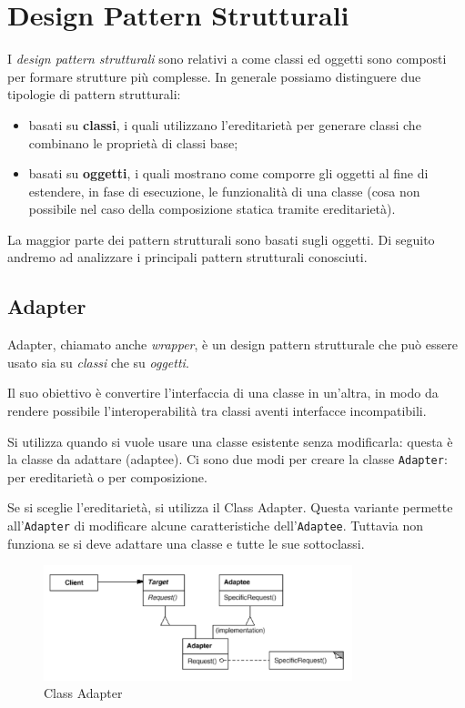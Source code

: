 \section{Design Pattern Strutturali}
I \textit{design pattern strutturali} sono relativi a come classi ed oggetti sono composti per formare strutture più complesse. 
In generale possiamo distinguere due tipologie di pattern strutturali:
\begin{itemize}
\item basati su \textbf{classi}, i quali utilizzano l'ereditarietà per generare classi che combinano le proprietà di classi base;
\item basati su \textbf{oggetti}, i quali mostrano come comporre gli oggetti al fine di estendere, in fase di esecuzione, le funzionalità di una classe (cosa non possibile nel caso della composizione statica tramite ereditarietà).
\end{itemize}
La maggior parte dei pattern strutturali sono basati sugli oggetti.
Di seguito andremo ad analizzare i principali pattern strutturali conosciuti.

\subsection{Adapter}
Adapter, chiamato anche \textit{wrapper}, è un design pattern strutturale che può essere usato sia su \textit{classi} che su \textit{oggetti}.

Il suo obiettivo è convertire l'interfaccia di una classe in un'altra, in modo da rendere possibile l'interoperabilità tra classi aventi interfacce incompatibili.

Si utilizza quando si vuole usare una classe esistente senza modificarla: questa è la classe da adattare (adaptee). Ci sono due modi per creare la classe \texttt{Adapter}: per ereditarietà o per composizione.

Se si sceglie l'ereditarietà, si utilizza il Class Adapter. Questa variante permette all'\texttt{Adapter} di modificare alcune caratteristiche dell'\texttt{Adaptee}. Tuttavia non funziona se si deve adattare una classe e tutte le sue sottoclassi.

\begin{figure}[H]
\includegraphics[width=0.8\textwidth]{res/img/DP/classAdapter}
\caption{Class Adapter}
\end{figure}

